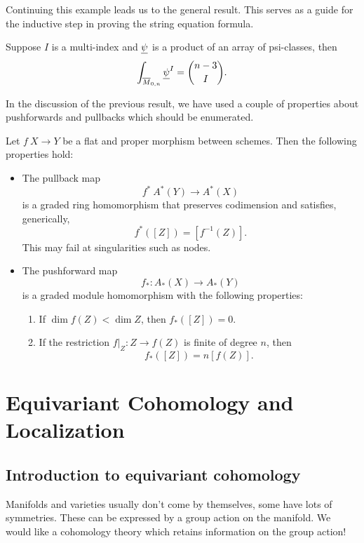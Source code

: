 \documentclass[12pt]{memoir}
\begin{document}
Continuing this example leads us to the general result. This serves as a guide for the inductive step in proving the string equation formula.

\begin{Th}
    Suppose $I$ is a multi-index and $\underline\psi$ is a product of an array of psi-classes, then 
    $$\int_{\overline{M}_{0,n}}\underline\psi^I=\binom{n-3}{I}.$$
\end{Th}

In the discussion of the previous result, we have used a couple of properties about pushforwards and pullbacks which should be enumerated.

\begin{Prop}\label{prop:push-pull-properties}
Let $f\: X \to Y$ be a flat and proper morphism between schemes. Then the following properties hold:
\begin{itemize}
    \item The pullback map
    $$f^\ast\: A^\ast(Y) \to A^\ast(X)$$
    is a graded ring homomorphism that preserves codimension and satisfies, generically,
    $$f^\ast([Z]) = [f^{-1}(Z)].$$
    This may fail at singularities such as nodes.
    \item The pushforward map
    $$f_\ast\colon A_\ast(X) \to A_\ast(Y)$$
    is a graded module homomorphism with the following properties:
    \begin{enumerate}
        \item If $\dim f(Z) < \dim Z$, then $f_\ast([Z]) = 0$.
        \item If the restriction $f|_Z\colon Z \to f(Z)$ is finite of degree $n$, then
        $$f_\ast([Z]) = n [f(Z)].$$
    \end{enumerate}
\end{itemize}
\end{Prop}

\chapter{Equivariant Cohomology and Localization}

\section{Introduction to equivariant cohomology}

Manifolds and varieties usually don't come by themselves, some have lots of symmetries. These can be expressed by a group action on the manifold. We would like a cohomology theory which retains information on the group action!
\end{document}
